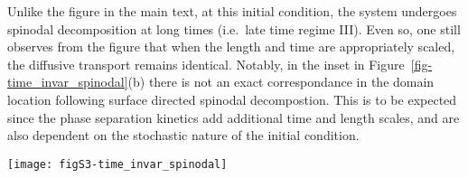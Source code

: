 \documentclass[journal=mamobx,manuscript=suppinfo]{achemso}
\newcommand{\txtf}{\mathrm{f}}
\begin{document}
Unlike the figure in the main text, at this initial condition, the system undergoes spinodal decomposition at long times (i.e.\ late time regime III).
Even so, one still observes from the figure that when the length and time are appropriately scaled, the diffusive transport remains identical.
Notably, in the inset in Figure~\ref{fig-time_invar_spinodal}(b) there is not an exact correspondance in the domain location following surface directed spinodal decompostion.
This is to be expected since the phase separation kinetics add additional time and length scales, and are also dependent on the stochastic nature of the initial condition.

\begin{figure*}[tbp]
  \texttt{[image: figS3-time\_invar\_spinodal]}
  \caption{Comparison of the long time diffusion dynamics between two differnet film thicknesses in (a) composition space and (b) real space. 
The solid curves show a film thickess of $l_{\txtf} = 102.4$ at time points (i) 10, (ii) 500, (iii) $2\times10^{3}$, and (iv) $5\times10^{3}$ (in units of the Rouse time).
The closed circles show a film thickness of $l_{\txtf} = 51.2$ at time points (i) 2.5, (ii) 125, (iii) 500, and (iv) $1.25\times10^{3}$
The inset depicts a zoomed-in portion of the real space volume fraction profile curve (iii).}
  \label{fig-time_invar_spinodal}
\end{figure*}


\clearpage

\end{document}
